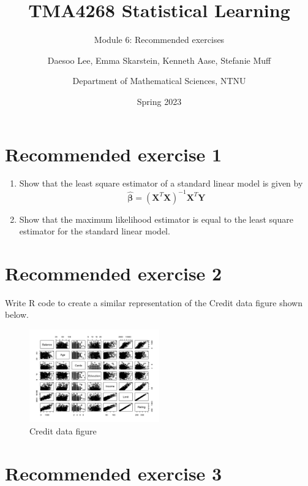 \documentclass[
]{article}
\title{TMA4268 Statistical Learning}
\subtitle{Module 6: Recommended exercises}
\author{Daesoo Lee, Emma Skarstein, Kenneth Aase, Stefanie
Muff \and Department of Mathematical Sciences, NTNU}
\date{Spring 2023}
\providecommand{\tightlist}{%
  \setlength{\itemsep}{0pt}\setlength{\parskip}{0pt}}
\begin{document}
\maketitle

{
\setcounter{tocdepth}{2}
\tableofcontents
}
\hypertarget{recommended-exercise-1}{%
\section{Recommended exercise 1}\label{recommended-exercise-1}}

\begin{enumerate}
\def\labelenumi{\arabic{enumi}.}
\tightlist
\item
  Show that the least square estimator of a standard linear model is
  given by
  \[ \hat{\boldsymbol \beta} =(\boldsymbol X^T \boldsymbol X)^{-1} \boldsymbol X^T \boldsymbol Y\]
\item
  Show that the maximum likelihood estimator is equal to the least
  square estimator for the standard linear model.
\end{enumerate}

\hypertarget{recommended-exercise-2}{%
\section{Recommended exercise 2}\label{recommended-exercise-2}}

Write R code to create a similar representation of the Credit data
figure shown below.

\begin{figure}
\centering
\includegraphics[width=0.5\textwidth,height=\textheight]{credit_card_data.png}
\caption{Credit data figure}
\end{figure}

\hypertarget{recommended-exercise-3}{%
\section{Recommended exercise 3}\label{recommended-exercise-3}}
\end{document}
